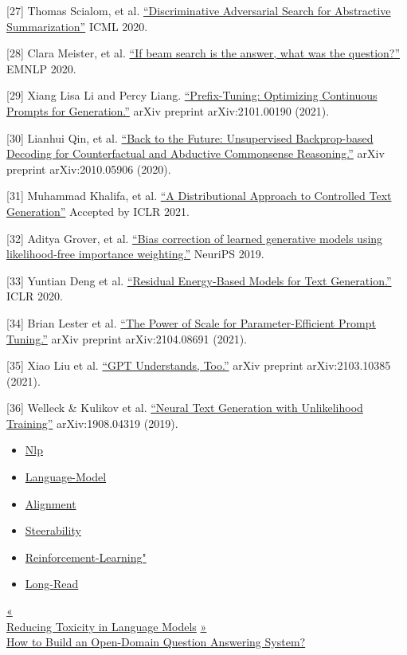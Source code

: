 {[}27{]} Thomas Scialom, et al. \href{https://arxiv.org/abs/2002.10375}{``Discriminative Adversarial Search for Abstractive Summarization''} ICML 2020.

{[}28{]} Clara Meister, et al. \href{https://arxiv.org/abs/2010.02650}{``If beam search is the answer, what was the question?''} EMNLP 2020.

{[}29{]} Xiang Lisa Li and Percy Liang. \href{https://arxiv.org/abs/2101.00190}{``Prefix-Tuning: Optimizing Continuous Prompts for Generation.''} arXiv preprint arXiv:2101.00190 (2021).

{[}30{]} Lianhui Qin, et al. \href{https://arxiv.org/abs/2010.05906}{``Back to the Future: Unsupervised Backprop-based Decoding for Counterfactual and Abductive Commonsense Reasoning.''} arXiv preprint arXiv:2010.05906 (2020).

{[}31{]} Muhammad Khalifa, et al. \href{https://arxiv.org/abs/2012.11635}{``A Distributional Approach to Controlled Text Generation''} Accepted by ICLR 2021.

{[}32{]} Aditya Grover, et al. \href{https://arxiv.org/abs/1906.09531}{``Bias correction of learned generative models using likelihood-free importance weighting.''} NeuriPS 2019.

{[}33{]} Yuntian Deng et al. \href{https://arxiv.org/abs/2004.11714}{``Residual Energy-Based Models for Text Generation.''} ICLR 2020.

{[}34{]} Brian Lester et al. \href{https://arxiv.org/abs/2104.08691}{``The Power of Scale for Parameter-Efficient Prompt Tuning.''} arXiv preprint arXiv:2104.08691 (2021).

{[}35{]} Xiao Liu et al. \href{https://arxiv.org/abs/2103.10385}{``GPT Understands, Too.''} arXiv preprint arXiv:2103.10385 (2021).

{[}36{]} Welleck \& Kulikov et al. \href{https://arxiv.org/abs/1908.04319}{``Neural Text Generation with Unlikelihood Training''} arXiv:1908.04319 (2019).

\begin{itemize}
\tightlist
\item
  \href{https://lilianweng.github.io/tags/nlp/}{Nlp}
\item
  \href{https://lilianweng.github.io/tags/language-model/}{Language-Model}
\item
  \href{https://lilianweng.github.io/tags/alignment/}{Alignment}
\item
  \href{https://lilianweng.github.io/tags/steerability/}{Steerability}
\item
  \href{https://lilianweng.github.io/tags/reinforcement-learning/}{Reinforcement-Learning"}
\item
  \href{https://lilianweng.github.io/tags/long-read/}{Long-Read}
\end{itemize}

\href{https://lilianweng.github.io/posts/2021-03-21-lm-toxicity/}{{« }\\
{Reducing Toxicity in Language Models}} \href{https://lilianweng.github.io/posts/2020-10-29-odqa/}{{ »}\\
{How to Build an Open-Domain Question Answering System?}}

